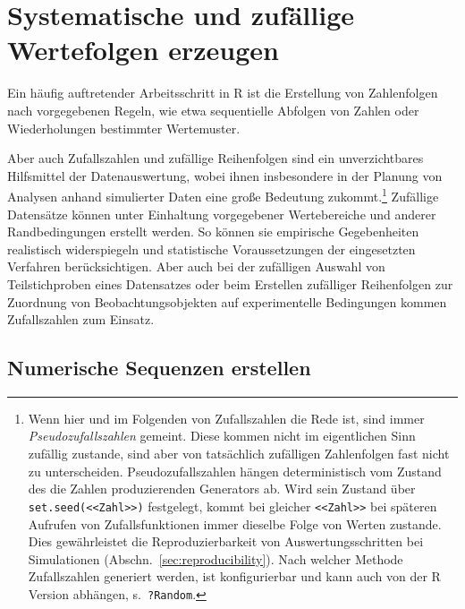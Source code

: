 \section{Systematische und zufällige Wertefolgen erzeugen}
\label{sec:gen_sequence}

Ein häufig auftretender Arbeitsschritt in R ist die Erstellung von Zahlenfolgen nach vorgegebenen Regeln, wie etwa sequentielle Abfolgen von Zahlen oder Wiederholungen bestimmter Wertemuster.

Aber auch Zufallszahlen und zufällige Reihenfolgen sind ein unverzichtbares Hilfsmittel der Datenauswertung, wobei ihnen insbesondere in der Planung von Analysen anhand simulierter Daten eine große Bedeutung zukommt.\footnote{\label{ftn:random_num}Wenn hier und im Folgenden von Zufallszahlen die Rede ist, sind immer \emph{Pseudozufallszahlen} gemeint. Diese kommen nicht im eigentlichen Sinn zufällig zustande, sind aber von tatsächlich zufälligen Zahlenfolgen fast nicht zu unterscheiden. Pseudozufallszahlen hängen deterministisch vom Zustand des die Zahlen produzierenden Generators ab. Wird sein Zustand über \lstinline!set.seed(<<Zahl>>)! festgelegt, kommt bei gleicher \lstinline!<<Zahl>>! bei späteren Aufrufen von Zufallsfunktionen immer dieselbe Folge von Werten zustande. Dies gewährleistet die Reproduzierbarkeit von Auswertungsschritten bei Simulationen (Abschn.\ \ref{sec:reproducibility}). Nach welcher Methode Zufallszahlen generiert werden, ist konfigurierbar und kann auch von der R Version abhängen, s.\ \lstinline!?Random!.} Zufällige Datensätze können unter Einhaltung vorgegebener Wertebereiche und anderer Randbedingungen erstellt werden. So können sie empirische Gegebenheiten realistisch widerspiegeln und statistische Voraussetzungen der eingesetzten Verfahren berücksichtigen. Aber auch bei der zufälligen Auswahl von Teilstichproben eines Datensatzes oder beim Erstellen zufälliger Reihenfolgen zur Zuordnung von Beobachtungsobjekten auf experimentelle Bedingungen kommen Zufallszahlen zum Einsatz.

\subsection{Numerische Sequenzen erstellen}
\label{sec:seq}

